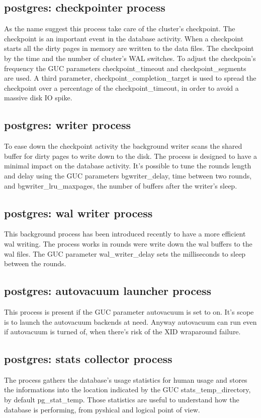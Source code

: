 \subsection{postgres: checkpointer process}
As the name suggest this process take care of the cluster's 
checkpoint. The checkpoint is an important event in the 
database activity. When a checkpoint starts all the dirty 
pages in memory are written to the data files. 
The checkpoint by the time and the number of cluster's WAL switches.
To adjust the checkpoin's frequency the GUC parameters checkpoint\_timeout and 
checkpoint\_segments are used. A third parameter, 
checkpoint\_completion\_target is used to spread the checkpoint over a 
percentage of the checkpoint\_timeout, in order to avoid a massive disk IO 
spike.

\subsection{postgres: writer process}
To ease down the checkpoint activity the background writer scans the shared 
buffer for dirty pages to write down to the disk. The process is designed to 
have a minimal impact on the database activity. It's possible to tune the rounds
length and delay using the GUC parameters bgwriter\_delay, time between two 
rounds, and bgwriter\_lru\_maxpages, the number of buffers after the writer's 
sleep.


\subsection{postgres: wal writer process}
This background process has been introduced recently to have a more efficient 
wal writing. The process works in rounds were write down the wal buffers to the 
wal files. The GUC parameter wal\_writer\_delay sets 
the milliseconds to sleep between the rounds. 

\subsection{postgres: autovacuum launcher process}
This process is present if the GUC parameter autovacuum is set to on.
It's scope is to launch the autovacuum backends at need.
Anyway autovacuum can run even if autovacuum is turned of, when there's risk 
of the XID wraparound failure.

\subsection{postgres: stats collector process}
The process gathers the database's usage statistics for human usage and stores 
the informations into the location indicated by the GUC stats\_temp\_directory, 
by default pg\_stat\_temp. Those statistics are useful to understand 
how the database is performing, from pyshical and logical point of view.

